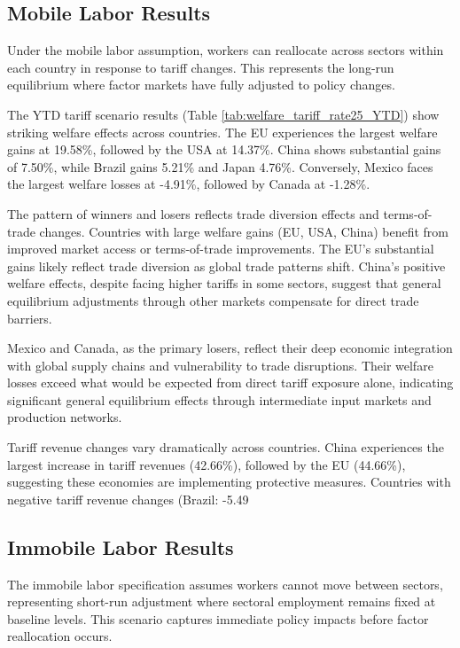 \subsection{Mobile Labor Results}

Under the mobile labor assumption, workers can reallocate across sectors within each country in response to tariff changes. This represents the long-run equilibrium where factor markets have fully adjusted to policy changes.

The YTD tariff scenario results (Table \ref{tab:welfare_tariff_rate25_YTD}) show striking welfare effects across countries. The EU experiences the largest welfare gains at 19.58\%, followed by the USA at 14.37\%. China shows substantial gains of 7.50\%, while Brazil gains 5.21\% and Japan 4.76\%. Conversely, Mexico faces the largest welfare losses at -4.91\%, followed by Canada at -1.28\%.

The pattern of winners and losers reflects trade diversion effects and terms-of-trade changes. Countries with large welfare gains (EU, USA, China) benefit from improved market access or terms-of-trade improvements. The EU's substantial gains likely reflect trade diversion as global trade patterns shift. China's positive welfare effects, despite facing higher tariffs in some sectors, suggest that general equilibrium adjustments through other markets compensate for direct trade barriers.

Mexico and Canada, as the primary losers, reflect their deep economic integration with global supply chains and vulnerability to trade disruptions. Their welfare losses exceed what would be expected from direct tariff exposure alone, indicating significant general equilibrium effects through intermediate input markets and production networks.

Tariff revenue changes vary dramatically across countries. China experiences the largest increase in tariff revenues (42.66\%), followed by the EU (44.66\%), suggesting these economies are implementing protective measures. Countries with negative tariff revenue changes (Brazil: -5.49%

\subsection{Immobile Labor Results}

The immobile labor specification assumes workers cannot move between sectors, representing short-run adjustment where sectoral employment remains fixed at baseline levels. This scenario captures immediate policy impacts before factor reallocation occurs.

